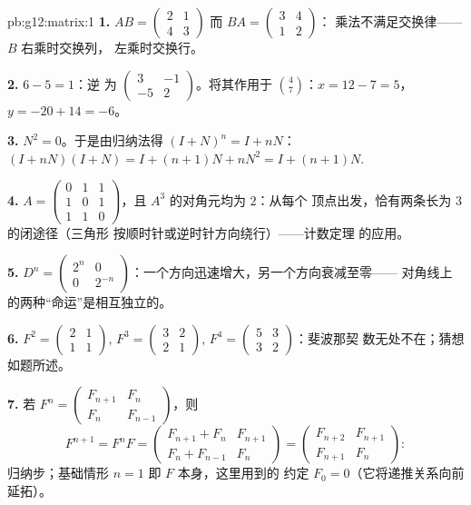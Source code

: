 \begin{solution}{pb:g12:matrix:1}
\textbf{1.} $AB = \begin{pmatrix} 2 & 1\\ 4 & 3\end{pmatrix}$
而 $BA = \begin{pmatrix} 3 & 4\\ 1 & 2\end{pmatrix}$：
乘法不满足交换律——$B$ 右乘时交换列，
左乘时交换行。

\textbf{2.}  $6 - 5 = 1$：逆
为 $\begin{pmatrix} 3 & -1\\ -5 & 2\end{pmatrix}$。将其作用于
$\binom{4}{7}$：$x = 12 - 7 = 5$，$y = -20 + 14 = -6$。

\textbf{3.} $N^2 = 0$。于是由归纳法得 $(I + N)^n = I + nN$：
$(I + nN)(I + N) = I + (n+1)N + nN^2 = I + (n+1)N$.

\textbf{4.} $A = \begin{pmatrix} 0&1&1\\ 1&0&1\\ 1&1&0
\end{pmatrix}$，且 $A^3$ 的对角元均为 $2$：从每个
顶点出发，恰有两条长为 $3$ 的闭途径（三角形
按顺时针或逆时针方向绕行）——计数定理
的应用。

\textbf{5.} $D^n = \begin{pmatrix} 2^n & 0\\ 0 & 2^{-n}
\end{pmatrix}$：一个方向迅速增大，另一个方向衰减至零——
对角线上的两种“命运”是相互独立的。

\textbf{6.} $F^2 = \begin{pmatrix} 2 & 1\\ 1 & 1\end{pmatrix}$,
$F^3 = \begin{pmatrix} 3 & 2\\ 2 & 1\end{pmatrix}$,
$F^4 = \begin{pmatrix} 5 & 3\\ 3 & 2\end{pmatrix}$：斐波那契
数无处不在；猜想如题所述。

\textbf{7.} 若 $F^n = \begin{pmatrix} F_{n+1} & F_n\\ F_n &
F_{n-1}\end{pmatrix}$，则
\[
F^{n+1} = F^n F =
\begin{pmatrix} F_{n+1} + F_n & F_{n+1}\\
F_n + F_{n-1} & F_n \end{pmatrix}
= \begin{pmatrix} F_{n+2} & F_{n+1}\\ F_{n+1} & F_n
\end{pmatrix} :
\]
归纳步；基础情形 $n = 1$ 即 $F$ 本身，这里用到的
约定 $F_0 = 0$（它将递推关系向前延拓）。


\end{solution}
